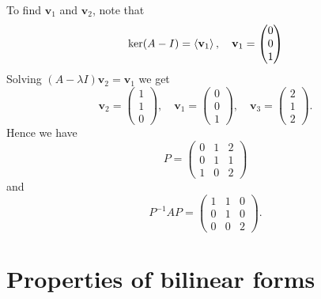 \documentclass[a4paper,11pt]{article}
\begin{document}
\begin{example}
	To find $\mathbf{v}_1$ and $\mathbf{v}_2$, note that 
	\[
		\ker (A-I) = \left\langle{} \mathbf{v}_1 \right\rangle,\quad \mathbf{v}_1 = \begin{pmatrix}
			 0 \\
			 0 \\
			 1 \\
		\end{pmatrix}
	\]
	Solving $ (A-\lambda I)\mathbf{v}_2 = \mathbf{v}_1 $ we get 
	\[
		\mathbf{v}_2 =
		\begin{pmatrix}
		  1\\1\\0
		\end{pmatrix},\quad
		\mathbf{v}_1 =
		\begin{pmatrix}
		  0\\0\\1
		\end{pmatrix},\quad
		\mathbf{v}_3 =
		\begin{pmatrix}
		  2\\1\\2
		\end{pmatrix}.
	  \]
	Hence we have
	\[
	  P =
	  \begin{pmatrix}
		0 & 1 & 2\\
		0 & 1 & 1\\
		1 & 0 & 2
	  \end{pmatrix}
	\]
	and
	\[
	  P^{-1} AP = \begin{pmatrix}
		1 & 1 & 0\\
		0 & 1 & 0\\
		0 & 0 & 2
	  \end{pmatrix}.
	\]
  \end{example}

\section{Properties of bilinear forms}
\end{document}
